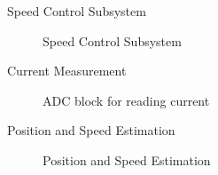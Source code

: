 \begin{frame}{Speed Control Subsystem}
	\begin{figure}
		\centering

		\caption{Speed Control Subsystem}
	\end{figure}
\end{frame}

\begin{frame}{Current Measurement}
	\begin{figure}
		\centering

		\caption{ADC block for reading current}
	\end{figure}
\end{frame}

\begin{frame}{Position and Speed Estimation}
	\begin{figure}
		\centering

		\caption{Position and Speed Estimation}
	\end{figure}
\end{frame}

